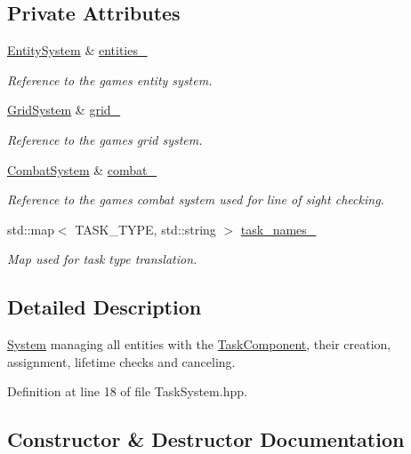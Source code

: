 \subsection*{Private Attributes}
\begin{DoxyCompactItemize}
\item 
\hyperlink{class_entity_system}{Entity\+System} \& \hyperlink{class_task_system_a92fe2ce299d1d92fed4808759795208c}{entities\+\_\+}
\begin{DoxyCompactList}\small\item\em Reference to the game\textquotesingle{}s entity system. \end{DoxyCompactList}\item 
\hyperlink{class_grid_system}{Grid\+System} \& \hyperlink{class_task_system_a243548d95e14a6e25c30b6cd30dff93b}{grid\+\_\+}
\begin{DoxyCompactList}\small\item\em Reference to the game\textquotesingle{}s grid system. \end{DoxyCompactList}\item 
\hyperlink{class_combat_system}{Combat\+System} \& \hyperlink{class_task_system_a4fe11f97b0acdc517f04ce1c945c62db}{combat\+\_\+}
\begin{DoxyCompactList}\small\item\em Reference to the game\textquotesingle{}s combat system used for line of sight checking. \end{DoxyCompactList}\item 
std\+::map$<$ T\+A\+S\+K\+\_\+\+T\+Y\+PE, std\+::string $>$ \hyperlink{class_task_system_aac7221e5575b4bf4514f1f2a84973a8e}{task\+\_\+names\+\_\+}
\begin{DoxyCompactList}\small\item\em Map used for task type translation. \end{DoxyCompactList}\end{DoxyCompactItemize}


\subsection{Detailed Description}
\hyperlink{class_system}{System} managing all entities with the \hyperlink{struct_task_component}{Task\+Component}, their creation, assignment, lifetime checks and canceling. 

Definition at line 18 of file Task\+System.\+hpp.



\subsection{Constructor \& Destructor Documentation}
